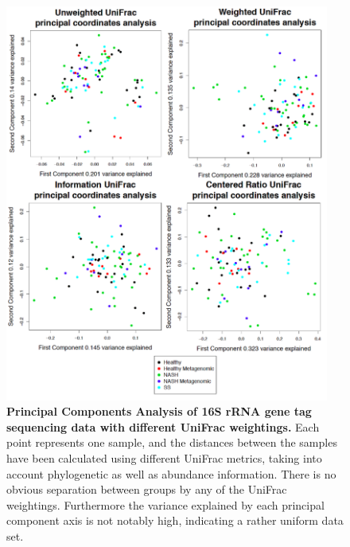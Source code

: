 \begin{figure}[h]
\begin{center}
\includegraphics[width=0.95\textwidth]{nafld_16s_pcoa.png}
\caption{\textbf{Principal Components Analysis of 16S rRNA gene tag sequencing data with different UniFrac weightings.} Each point represents one sample, and the distances between the samples have been calculated using different UniFrac metrics, taking into account phylogenetic as well as abundance information. There is no obvious separation between groups by any of the UniFrac weightings. Furthermore the variance explained by each principal component axis is not notably high, indicating a rather uniform data set.}
\end{center}
\label{nafld_fig2}
\end{figure}

